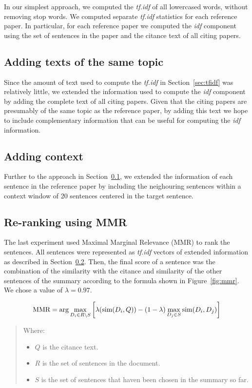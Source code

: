 \documentclass[11pt]{article}
\begin{document}
In our simplest approach, we computed the \emph{tf.idf} of all
lowercased words, without removing stop words. We computed separate
\emph{tf.idf} statistics for each reference paper. In particular, for
each reference paper we computed the \emph{idf} component using the
set of sentences in the paper and the citance text of all citing
papers.

\subsection{Adding texts of the same topic}\label{sec:topics}

Since the amount of text used to compute the \emph{tf.idf} in
Section~\ref{sec:tfidf} was relatively little, we extended the
information used to compute the \emph{idf} component by adding the
complete text of all citing papers. Given that the citing papers are
presumably of the same topic as the reference paper, by adding this
text we hope to include complementary information that can be useful
for computing the \emph{idf} information.

\subsection{Adding context}\label{sec:context}

Further to the approach in Section~\ref{sec:topics}, we extended the
information of each sentence in the reference paper by including the
neighouring sentences within a context window of 20 sentences centered
in the target sentence.

\subsection{Re-ranking using MMR}\label{sec:mmr}

The last experiment used Maximal Marginal Relevance (MMR)
\cite{Carbonell:1998} to rank the sentences. All sentences were
represented as \emph{tf.idf} vectors of extended information as
described in Section~\ref{sec:context}. Then, the final score of a
sentence was the combination of the similarity with the citance and
similarity of the other sentences of the summary according to the
formula shown in Figure~\ref{fig:mmr}. We chose a value of
$\lambda=0.97$.

\begin{figure*}
$$
\hbox{MMR} = \arg\max_{D_i\in R\setminus S}\left[\lambda(\hbox{sim}(D_i,Q)) -
(1-\lambda) \max_{D_j\in S} \hbox{sim}(D_i,D_j)\right]
$$  
\begin{quote}
Where:
\begin{itemize}
\item $Q$ is the citance text.
\item $R$ is the set of sentences in the document.
\item $S$ is the set of sentences that haven been chosen in the
  summary so far.  
\end{itemize}
\end{quote}
  \caption{Maximal Marginal Relevance (MMR)}
  \label{fig:mmr}
\end{figure*}
\end{document}
